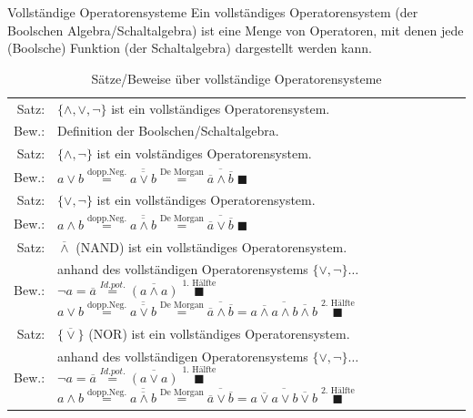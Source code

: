 \documentclass[10pt,a4paper]{scrartcl}
\begin{document}
\begin{Theorem}{Vollständige Operatorensysteme}{}
	Ein vollständiges Operatorensystem (der Boolschen Algebra/Schaltalgebra) ist eine Menge von Operatoren, mit denen jede (Boolsche) Funktion (der Schaltalgebra) dargestellt werden kann.
\end{Theorem}

\begin{table}[h!]
	\centering
	\begin{tabular}{rp{10cm}}
	Satz: & $ \{\wedge, \vee, \neg\} $ ist ein vollständiges Operatorensystem.\\
	Bew.:& Definition der Boolschen/Schaltalgebra.\\ \hline
	Satz: & $ \{\wedge, \neg\} $ ist ein volständiges Operatorensystem.\\
	Bew.:& $ a \vee b \overset{\text{dopp.Neg.}}{=} \overline{\overline{a\vee b}} \overset{\text{De Morgan}}{=} \overline{\overline{a} \wedge \overline{b}}\; \blacksquare$\\ \hline
	Satz: & $ \{\vee, \neg\} $ ist ein vollständiges Operatorensystem.\\
	Bew.:& $ a \wedge b \overset{\text{dopp.Neg.}}{=} \overline{\overline{a \wedge b}} \overset{\text{De Morgan}}{=} \overline{\overline{a} \vee \overline{b}}\; \blacksquare $\\ \hline
	Satz: & $ \overline{\wedge} $ (\glqq NAND\grqq) ist ein vollständiges Operatorensystem.\\
	Bew.: & anhand des vollständigen Operatorensystems $ \{\vee, \neg\}\ldots $
	\newline $ \neg a = \overline{a} \overset{Id.pot.}{=} \overline{(a \wedge a)} \;\overset{\text{1. Hälfte}}{\blacksquare}$
	\newline $ a \vee b \overset{\text{dopp.Neg.}}{=} \overline{\overline{a \vee b}} \overset{\text{De Morgan}}{=} \overline{\overline{a} \wedge \overline{b}} = \overline{\overline{a \wedge a} \wedge \overline{b \wedge b}} \;\overset{\text{2. Hälfte}}{\blacksquare}$\\ \hline
	Satz: & $ \{\overline{\vee}\} $ (\glqq NOR\grqq) ist ein vollständiges Operatorensystem.\\
	Bew.: &anhand des vollständigen Operatorensystems $ \{\vee, \neg\}\ldots $
	\newline $ \neg a = \overline{a} \overset{Id.pot.}{=} \overline{(a \vee a)} \;\overset{\text{1. Hälfte}}{\blacksquare}$
	\newline $ a \wedge b \overset{\text{dopp.Neg.}}{=} \overline{\overline{a \wedge b}} \overset{\text{De Morgan}}{=} \overline{\overline{a} \vee \overline{b}} = \overline{\overline{a \vee a} \vee \overline{b \vee b}} \;\overset{\text{2. Hälfte}}{\blacksquare}$\\ %
\end{tabular}
\caption{Sätze/Beweise über vollständige Operatorensysteme}
\end{table}
\end{document}
